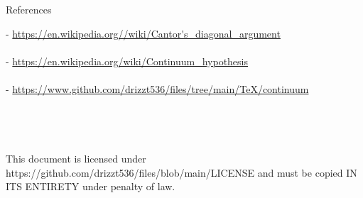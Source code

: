 \documentclass[12pt]{article}
\begin{document}
\pagebreak\begin{section}{References}\label{sec:references}

	\noindent- \url{https://en.wikipedia.org//wiki/Cantor's\_diagonal\_argument}\\
	\indent{}\\

	\noindent- \url{https://en.wikipedia.org/wiki/Continuum_hypothesis}\\
	\indent{}\\

	\noindent- \url{https://www.github.com/drizzt536/files/tree/main/TeX/continuum}\\
	\indent{}
	\\
	\\
	\\
	\\
	This document is licensed under https://github.com/drizzt536/files/blob/main/LICENSE
	and must be copied IN ITS ENTIRETY under penalty of law.
\end{section}
\end{document}
